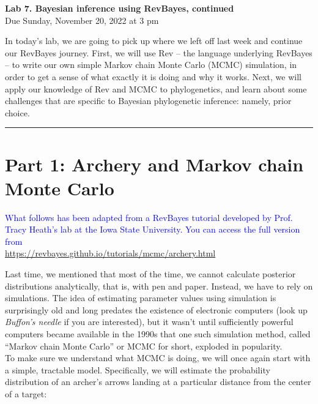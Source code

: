 \documentclass[12pt]{article}
\begin{document}
\frenchspacing

\begin{center}
{\Large \textbf{Lab 7. Bayesian inference using RevBayes, continued}} \\[0.5cm]
{\large Due Sunday, November 20, 2022 at 3 pm}
\end{center}

\vspace{1cm}

\noindent In today's lab, we are going to pick up where we left off last week and continue our RevBayes journey. First, we will use Rev -- the language underlying RevBayes -- to write our own simple Markov chain Monte Carlo (MCMC) simulation, in order to get a sense of what exactly it is doing and why it works. Next, we will apply our knowledge of Rev and MCMC to phylogenetics, and learn about some challenges that are specific to Bayesian phylogenetic inference: namely, prior choice. \\

\hrule

\section*{Part 1: Archery and Markov chain Monte Carlo}

\begin{center}
\textcolor{blue}{What follows has been adapted from a RevBayes tutorial developed by Prof. Tracy Heath's lab at the Iowa State University. You can access the full version from \\
\url{https://revbayes.github.io/tutorials/mcmc/archery.html}}
\end{center}

\noindent Last time, we mentioned that most of the time, we cannot calculate posterior distributions analytically, that is, with pen and paper. Instead, we have to rely on simulations. The idea of estimating parameter values using simulation is surprisingly old and long predates the existence of electronic computers (look up \textit{Buffon's needle} if you are interested), but it wasn't until sufficiently powerful computers became available in the 1990s that one such simulation method, called ``Markov chain Monte Carlo'' or MCMC for short, exploded in popularity. \\

\noindent To make sure we understand what MCMC is doing, we will once again start with a simple, tractable model. Specifically, we will estimate the probability distribution of an archer's arrows landing at a particular distance from the center of a target:
\end{document}
